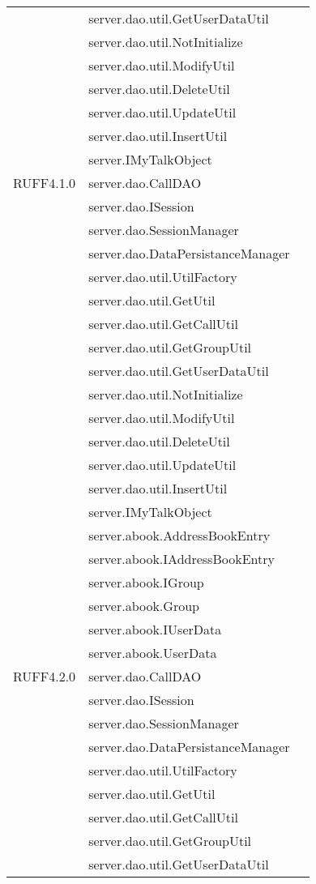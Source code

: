 \begin{center}
\begin{longtable}{lp{}l}
& server.dao.util.GetUserDataUtil\\
& server.dao.util.NotInitialize\\
& server.dao.util.ModifyUtil\\
& server.dao.util.DeleteUtil\\
& server.dao.util.UpdateUtil\\
& server.dao.util.InsertUtil\\
& server.IMyTalkObject\\
RUFF4.1.0 & server.dao.CallDAO\\
& server.dao.ISession\\
& server.dao.SessionManager\\
& server.dao.DataPersistanceManager\\
& server.dao.util.UtilFactory\\
& server.dao.util.GetUtil\\
& server.dao.util.GetCallUtil\\
& server.dao.util.GetGroupUtil\\
& server.dao.util.GetUserDataUtil\\
& server.dao.util.NotInitialize\\
& server.dao.util.ModifyUtil\\
& server.dao.util.DeleteUtil\\
& server.dao.util.UpdateUtil\\
& server.dao.util.InsertUtil\\
& server.IMyTalkObject\\
& server.abook.AddressBookEntry\\
& server.abook.IAddressBookEntry\\
& server.abook.IGroup\\
& server.abook.Group\\
& server.abook.IUserData\\
& server.abook.UserData\\
RUFF4.2.0 & server.dao.CallDAO\\
& server.dao.ISession\\
& server.dao.SessionManager\\
& server.dao.DataPersistanceManager\\
& server.dao.util.UtilFactory\\
& server.dao.util.GetUtil\\
& server.dao.util.GetCallUtil\\
& server.dao.util.GetGroupUtil\\
& server.dao.util.GetUserDataUtil\\

\end{longtable}
\end{center}
